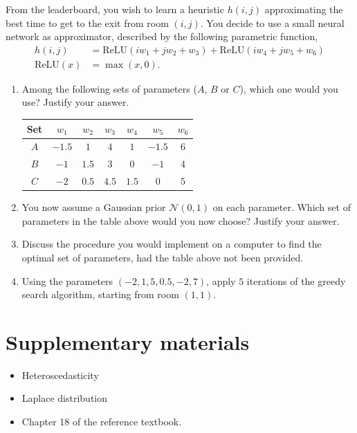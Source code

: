 \documentclass[11pt, a4paper]{article}
\begin{document}
From the leaderboard, you wish to learn a heuristic $h(i, j)$ approximating the best time to get to the exit from room $(i, j)$. You decide to use a small neural network as approximator, described by the following parametric function,
\begin{align*}
    h(i, j) & = \text{ReLU}(i w_1 + j w_2 + w_3) + \text{ReLU}(i w_4 + j w_5 + w_6) \\
    \text{ReLU}(x) & = \max(x, 0).
\end{align*}

\begin{enumerate}[label=(\alph*)]
    \item Among the following sets of parameters ($A$, $B$ or $C$), which one would you use? Justify your answer.

    \begin{table}[h]
        \centering
        \begin{tabular}{c|cccccc}
            \toprule
            Set & $w_1$ & $w_2$ & $w_3$ & $w_4$ & $w_5$ & $w_6$ \\
            \midrule
            $A$ &$-1.5$ & $1$ & $4$ & $1$ & $-1.5$ & $6$ \\
            $B$ &$-1$ & $1.5$ & $3$ & $0$ & $-1$ & $4$ \\
            $C$ &$-2$ & $0.5$ & $4.5$ & $1.5$ & $0$ & $5$ \\
            \bottomrule
        \end{tabular}
    \end{table}

    \item You now assume a Gaussian prior $\mathcal{N}(0, 1)$ on each parameter. Which set of parameters in the table above would you now choose? Justify your answer.
    \item Discuss the procedure you would implement on a computer to find the optimal set of parameters, had the table above not been provided.
    \item Using the parameters $(-2, 1, 5, 0.5, -2, 7)$, apply $5$ iterations of the greedy search algorithm, starting from room $(1, 1)$.
\end{enumerate}

\newpage

\section*{Supplementary materials}

\begin{itemize}
    \item Heteroscedasticity


    \item Laplace distribution


    \item Chapter 18 of the reference textbook.
\end{itemize}
\end{document}
